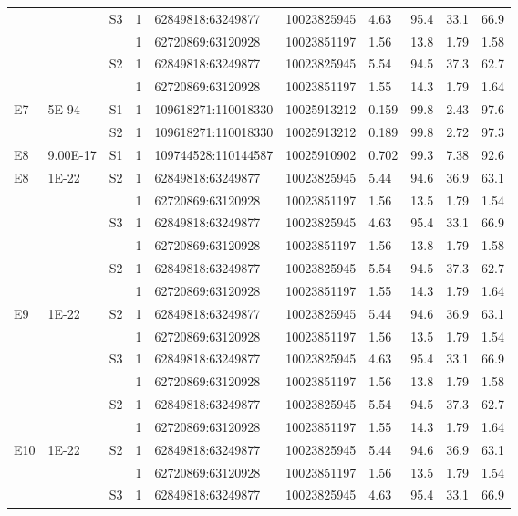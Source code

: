 \documentclass[a4paper,12pt]{article}
\begin{document}
\begin{longtable}{@{\extracolsep{\fill}}llllllllll@{}}
 &  & S3 & 1 & 62849818:63249877 & 10023825945 & 4.63 & 95.4 & 33.1 & 66.9 \\
 &  &  & 1 & 62720869:63120928 & 10023851197 & 1.56 & 13.8 & 1.79 & 1.58 \\
 &  & S2 & 1 & 62849818:63249877 & 10023825945 & 5.54 & 94.5 & 37.3 & 62.7 \\
 &  &  & 1 & 62720869:63120928 & 10023851197 & 1.55 & 14.3 & 1.79 & 1.64 \\
E7 & 5E-94 & S1 & 1 & 109618271:110018330 & 10025913212 & 0.159 & 99.8 & 2.43 & 97.6 \\
 &  & S2 & 1 & 109618271:110018330 & 10025913212 & 0.189 & 99.8 & 2.72 & 97.3 \\
E8 & 9.00E-17 & S1 & 1 & 109744528:110144587 & 10025910902 & 0.702 & 99.3 & 7.38 & 92.6 \\
E8 & 1E-22 & S2 & 1 & 62849818:63249877 & 10023825945 & 5.44 & 94.6 & 36.9 & 63.1 \\
 &  &  & 1 & 62720869:63120928 & 10023851197 & 1.56 & 13.5 & 1.79 & 1.54 \\
 &  & S3 & 1 & 62849818:63249877 & 10023825945 & 4.63 & 95.4 & 33.1 & 66.9 \\
 &  &  & 1 & 62720869:63120928 & 10023851197 & 1.56 & 13.8 & 1.79 & 1.58 \\
 &  & S2 & 1 & 62849818:63249877 & 10023825945 & 5.54 & 94.5 & 37.3 & 62.7 \\
 &  &  & 1 & 62720869:63120928 & 10023851197 & 1.55 & 14.3 & 1.79 & 1.64 \\
E9 & 1E-22 & S2 & 1 & 62849818:63249877 & 10023825945 & 5.44 & 94.6 & 36.9 & 63.1 \\
 &  &  & 1 & 62720869:63120928 & 10023851197 & 1.56 & 13.5 & 1.79 & 1.54 \\
 &  & S3 & 1 & 62849818:63249877 & 10023825945 & 4.63 & 95.4 & 33.1 & 66.9 \\
 &  &  & 1 & 62720869:63120928 & 10023851197 & 1.56 & 13.8 & 1.79 & 1.58 \\
 &  & S2 & 1 & 62849818:63249877 & 10023825945 & 5.54 & 94.5 & 37.3 & 62.7 \\
 &  &  & 1 & 62720869:63120928 & 10023851197 & 1.55 & 14.3 & 1.79 & 1.64 \\
E10 & 1E-22 & S2 & 1 & 62849818:63249877 & 10023825945 & 5.44 & 94.6 & 36.9 & 63.1 \\
 &  &  & 1 & 62720869:63120928 & 10023851197 & 1.56 & 13.5 & 1.79 & 1.54 \\
 &  & S3 & 1 & 62849818:63249877 & 10023825945 & 4.63 & 95.4 & 33.1 & 66.9 \\

\end{longtable}
\end{document}
